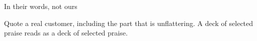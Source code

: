 
\begin{frame}{In their words, not ours}
  \begin{pullquote}
  Quote a real customer, including the part that is unflattering. A deck of selected praise
  reads as a deck of selected praise.
  \end{pullquote}
\end{frame}
